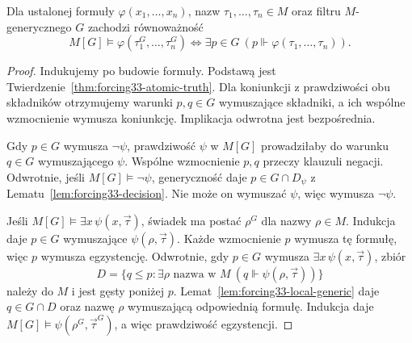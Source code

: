 \begin{twierdzenie}
\label{thm:forcing33-truth}
Dla ustalonej formuły
$\varphi(x_1,\ldots,x_n)$, nazw
$\tau_1,\ldots,\tau_n\in M$
oraz filtru $M$-generycznego $G$
zachodzi równoważność
\[
M[G]\models\varphi(\tau_1^G,\ldots,\tau_n^G)
\iff\exists p\in G\
(p\Vdash\varphi(\tau_1,\ldots,\tau_n)).
\]
\end{twierdzenie}
\begin{proof}
Indukujemy po budowie formuły.
Podstawą jest
Twierdzenie~\ref{thm:forcing33-atomic-truth}.
Dla koniunkcji z prawdziwości
obu składników otrzymujemy warunki
$p,q\in G$ wymuszające składniki,
a ich wspólne wzmocnienie wymusza
koniunkcję. Implikacja odwrotna
jest bezpośrednia.

Gdy $p\in G$ wymusza $\neg\psi$,
prawdziwość $\psi$ w $M[G]$
prowadziłaby do warunku $q\in G$
wymuszającego $\psi$.
Wspólne wzmocnienie $p,q$
przeczy klauzuli negacji.
Odwrotnie, jeśli $M[G]\models\neg\psi$,
generyczność daje $p\in G\cap D_\psi$
z Lematu~\ref{lem:forcing33-decision}.
Nie może on wymuszać $\psi$,
więc wymusza $\neg\psi$.

Jeśli $M[G]\models\exists x\,\psi(x,\vec\tau)$,
świadek ma postać $\rho^G$ dla nazwy
$\rho\in M$. Indukcja daje
$p\in G$ wymuszające $\psi(\rho,\vec\tau)$.
Każde wzmocnienie $p$ wymusza tę
formułę, więc $p$ wymusza egzystencję.
Odwrotnie, gdy $p\in G$ wymusza
$\exists x\,\psi(x,\vec\tau)$, zbiór
\[
D=\{q\leq p:\exists\rho\text{ nazwa w }M\
(q\Vdash\psi(\rho,\vec\tau))\}
\]
należy do $M$ i jest gęsty poniżej $p$.
Lemat~\ref{lem:forcing33-local-generic}
daje $q\in G\cap D$ oraz nazwę $\rho$
wymuszającą odpowiednią formułę.
Indukcja daje
$M[G]\models\psi(\rho^G,\vec\tau^G)$,
a więc prawdziwość egzystencji.
\end{proof}

